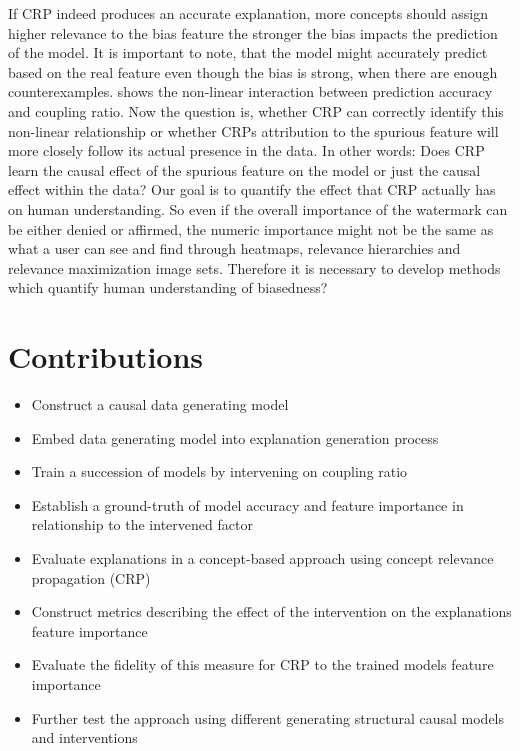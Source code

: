 If CRP indeed produces an accurate explanation, more concepts should assign higher relevance to the bias feature the stronger the bias impacts the prediction of the model. It is important to note, that the model might accurately predict based on the real feature even though the bias is strong, when there are enough counterexamples.  shows the non-linear interaction between prediction accuracy and coupling ratio.
Now the question is, whether CRP can correctly identify this non-linear relationship or whether CRPs attribution to the spurious feature will more closely follow its actual presence in the data. 
In other words: Does CRP learn the causal effect of the spurious feature on the model or just the causal effect within the data? Our goal is to quantify the effect that CRP actually has on human understanding. So even if the overall importance of the watermark can be either denied or affirmed, the numeric importance might not be the same as what a user can see and find through heatmaps, relevance hierarchies and relevance maximization image sets. Therefore it is necessary to develop methods which quantify human understanding of biasedness?  

\section{Contributions}
\begin{itemize}
    \item Construct a causal data generating model
    \item Embed data generating model into explanation generation process
    \item Train a succession of models by intervening on coupling ratio
    \item Establish a ground-truth of model accuracy and feature importance in relationship to the intervened factor
    \item Evaluate explanations in a concept-based approach using concept relevance propagation (CRP)
    \item Construct  metrics describing the effect of the intervention on the explanations feature importance 
    \item Evaluate the fidelity of this measure for CRP to the trained models feature importance
    \item Further test the approach using different generating structural causal models and interventions
\end{itemize}

